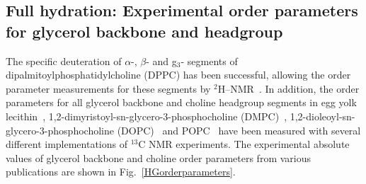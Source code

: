\documentclass[pre,aps,floatfix,authordate1-4,twocolumn]{revtex4-1}
\providecommand{\DIFadd}[1]{{\protect\color{blue}\uwave{#1}}} %
\providecommand{\DIFaddbegin}{} %
\providecommand{\DIFaddend}{} %
\begin{document}
\subsection{Full hydration: Experimental order parameters for \DIFaddbegin \DIFadd{the }\DIFaddend glycerol backbone and headgroup}\label{experiments}
The specific deuteration of $\alpha$-, $\beta$- and g$_3$- segments of dipalmitoylphosphatidylcholine (DPPC) has been successful, 
allowing the order parameter measurements for these segments by $^2$H--NMR~\cite{gally75,brown77,brown78,akutsu81}.
In addition, the order parameters for all glycerol backbone and choline headgroup segments in egg yolk lecithin~\cite{hong95a},
1,2-dimyristoyl-sn-glycero-3-phosphocholine (DMPC)~\cite{hong95b,gross97,dvinskikh05a}, 
1,2-dioleoyl-sn-glycero-3-phosphocholine (DOPC)~\cite{warschawski05} and POPC~\cite{warschawski05,ferreira13}
have been measured with several different implementations of $^{13}$C NMR experiments.
The experimental absolute values of glycerol backbone and choline order parameters from various publications are shown in Fig.~\ref{HGorderparameters}.
\end{document}
